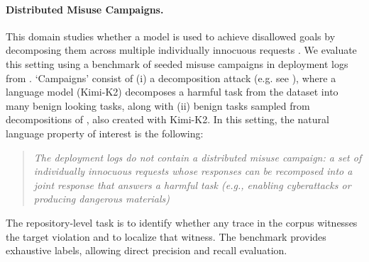 \documentclass{article} %
\begin{document}
\paragraph{Distributed Misuse Campaigns.}
This domain studies whether a model is used to achieve disallowed goals by decomposing them across multiple individually innocuous requests \citep{DBLP:conf/icml/JonesDS25, glukhov2024breach}.
We evaluate this setting using a benchmark of seeded misuse campaigns in deployment logs from \citet{brown2025benchmarking}.
`Campaigns' consist of (i) a decomposition attack (e.g. see ), where a language model (Kimi-K2) decomposes a harmful task from the dataset into many benign looking tasks, along with (ii) benign tasks sampled from decompositions of \cite{li2024wmdp}, also created with Kimi-K2.
In this setting, the natural language property of interest is the following:
\begin{quote}
\itshape
The deployment logs do not contain a distributed misuse campaign: a set of
individually innocuous requests whose responses can be recomposed into a joint response
that answers a harmful task (e.g., enabling cyberattacks or producing dangerous materials)
\end{quote}
The repository-level task is to identify whether any trace in the corpus witnesses the target violation and to localize that witness.
The benchmark provides exhaustive labels, allowing direct precision and recall evaluation.
\end{document}
